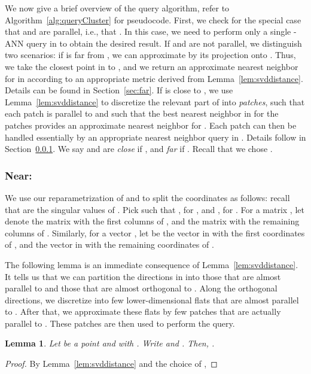 \documentclass[a4paper,11pt]{paper}
\newtheorem{lemma}[theorem]{Lemma}
\begin{document}
We now give a brief overview of the query algorithm,
refer to Algorithm~\ref{alg:queryCluster} for pseudocode.
First,  we check for the special case that  and  are
parallel, i.e., that . In
this case, we need to perform only a single -ANN
query in  to obtain the desired result.
If  and  are not parallel, we distinguish two
scenarios: if  is far from , we can approximate  by
its projection  onto . Thus, we take the closest point
 in  to , and we return an approximate nearest neighbor for
 in  according to an appropriate metric derived
from Lemma~\ref{lem:svddistance}. Details can be found in
Section~\ref{sec:far}.
If  is close to , we use Lemma~\ref{lem:svddistance} to
discretize the relevant
part of  into \emph{patches}, such that each patch is
parallel to  and such that the best nearest
neighbor in  for the patches provides an approximate nearest
neighbor for . Each patch can then
be handled essentially by an appropriate nearest neighbor
query in . Details follow in Section~\ref{sec:close}.
 We say  and  are \emph{close}
if , and \emph{far} if
. Recall that we chose .


\subsubsection{Near: }\label{sec:close}

We use our reparametrization of  and  to split the coordinates
as follows: recall that
 are the singular
values of . Pick  such that
, for , and
, for .
For a  matrix , let
 denote the  matrix with the first 
columns of , and  the  matrix with
the remaining  columns of .
Similarly, for a vector , let
 be the vector in  with the  first 
coordinates of , and  the vector in  with the
remaining  coordinates of .

The following lemma is an immediate consequence of
Lemma~\ref{lem:svddistance}. It tells us that
we can partition the directions in  into those that are
almost parallel to  and those that are almost orthogonal
to . Along the orthogonal directions, we discretize
 into few lower-dimensional flats that are almost
parallel to . After that, we approximate these flats
by few patches that are actually parallel to .
These patches are then used to perform the query.

\begin{lemma}\label{lem:orthogDiag}
  Let  be a point and
   with  .
  Write  and .
  Then, .
\end{lemma}
\begin{proof}
  By Lemma~\ref{lem:svddistance} and the choice of ,
  
\end{proof}
\end{document}
